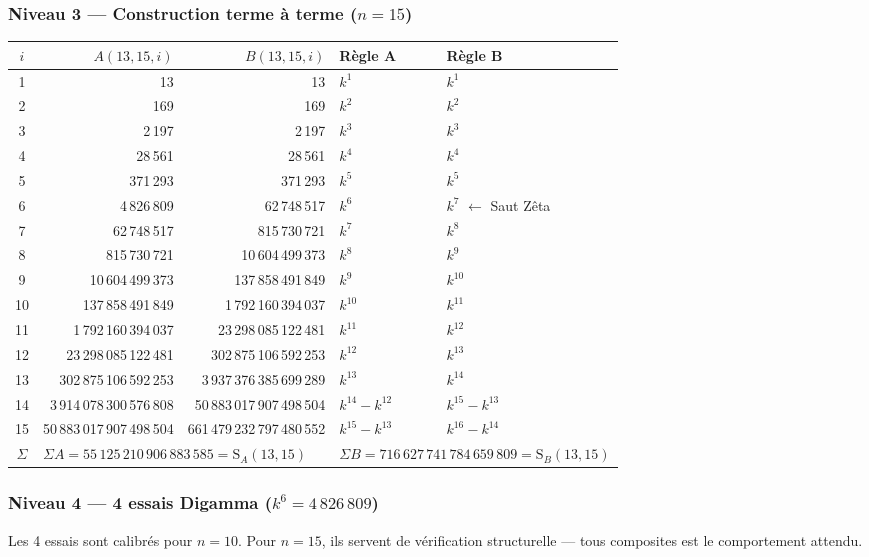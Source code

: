 \documentclass[11pt,a4paper]{article}
\newcommand{\SA}{\mathrm{S}_A}
\newcommand{\SB}{\mathrm{S}_B}
\begin{document}
\subsubsection{Niveau 3 --- Construction terme à terme (\texorpdfstring{$n = 15$}{n = 15})}
\begin{center}\small
\begin{tabular}{@{}c r r l l@{}}
\toprule
\rowcolor{spectralgris}
$i$ & $A(13,15,i)$ & $B(13,15,i)$ & Règle A & Règle B \\
\midrule
1 & 13 & 13 & $k^{1}$ & $k^{1}$ \\
2 & 169 & 169 & $k^{2}$ & $k^{2}$ \\
3 & 2\,197 & 2\,197 & $k^{3}$ & $k^{3}$ \\
4 & 28\,561 & 28\,561 & $k^{4}$ & $k^{4}$ \\
5 & 371\,293 & 371\,293 & $k^{5}$ & $k^{5}$ \\
6 & 4\,826\,809 & 62\,748\,517 & $k^{6}$ & $k^{7}$ $\leftarrow$ Saut Zêta \\
7 & 62\,748\,517 & 815\,730\,721 & $k^{7}$ & $k^{8}$ \\
8 & 815\,730\,721 & 10\,604\,499\,373 & $k^{8}$ & $k^{9}$ \\
9 & 10\,604\,499\,373 & 137\,858\,491\,849 & $k^{9}$ & $k^{10}$ \\
10 & 137\,858\,491\,849 & 1\,792\,160\,394\,037 & $k^{10}$ & $k^{11}$ \\
11 & 1\,792\,160\,394\,037 & 23\,298\,085\,122\,481 & $k^{11}$ & $k^{12}$ \\
12 & 23\,298\,085\,122\,481 & 302\,875\,106\,592\,253 & $k^{12}$ & $k^{13}$ \\
13 & 302\,875\,106\,592\,253 & 3\,937\,376\,385\,699\,289 & $k^{13}$ & $k^{14}$ \\
14 & 3\,914\,078\,300\,576\,808 & 50\,883\,017\,907\,498\,504 & $k^{14}-k^{12}$ & $k^{15}-k^{13}$ \\
15 & 50\,883\,017\,907\,498\,504 & 661\,479\,232\,797\,480\,552 & $k^{15}-k^{13}$ & $k^{16}-k^{14}$ \\
\midrule
$\Sigma$ & \multicolumn{2}{l}{$\Sigma A = 55\,125\,210\,906\,883\,585 = \SA(13,15)$} & \multicolumn{2}{l}{$\Sigma B = 716\,627\,741\,784\,659\,809 = \SB(13,15)$} \\
\bottomrule
\end{tabular}
\end{center}

\subsubsection{Niveau 4 --- 4 essais Digamma (\texorpdfstring{$k^{6} = 4\,826\,809$}{k^6 = 4,826,809})}
Les 4 essais sont calibrés pour $n=10$. Pour $n=15$, ils servent de
vérification structurelle --- tous composites est le comportement attendu.
\end{document}
